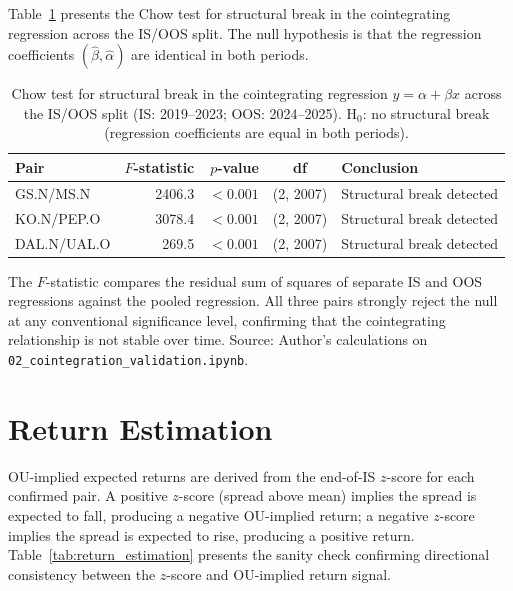 \documentclass[a4paper]{report}
\begin{document}
Table~\ref{tab:chow_results} presents the Chow test for structural break in the cointegrating
regression across the IS/OOS split. The null hypothesis is that the regression coefficients
$(\hat{\beta}, \hat{\alpha})$ are identical in both periods.

\begin{table}[htbp]
\centering
\caption{Chow test for structural break in the cointegrating regression $y = \alpha + \beta x$
across the IS/OOS split (IS: 2019--2023; OOS: 2024--2025).
H$_0$: no structural break (regression coefficients are equal in both periods).}
\label{tab:chow_results}
\begin{tabular}{lrrcl}
\toprule
Pair & $F$-statistic & $p$-value & df & Conclusion \\
\midrule
GS.N/MS.N   & 2406.3 & $<0.001$ & (2, 2007) & Structural break detected \\
KO.N/PEP.O  & 3078.4 & $<0.001$ & (2, 2007) & Structural break detected \\
DAL.N/UAL.O &  269.5 & $<0.001$ & (2, 2007) & Structural break detected \\
\bottomrule
\end{tabular}
\par\smallskip
\begin{minipage}{\linewidth}
\small
The $F$-statistic compares the residual sum of squares of separate IS and OOS regressions against the pooled regression. All three pairs strongly reject the null at any conventional significance level, confirming that the cointegrating relationship is not stable over time.
Source: Author's calculations on \texttt{02\_cointegration\_validation.ipynb}.
\end{minipage}
\end{table}

\FloatBarrier

\section{Return Estimation}

OU-implied expected returns are derived from the end-of-IS $z$-score for each
confirmed pair. A positive $z$-score (spread above mean) implies the spread is
expected to fall, producing a negative OU-implied return; a negative $z$-score
implies the spread is expected to rise, producing a positive return.
Table~\ref{tab:return_estimation} presents the sanity check confirming directional
consistency between the $z$-score and OU-implied return signal.
\end{document}
